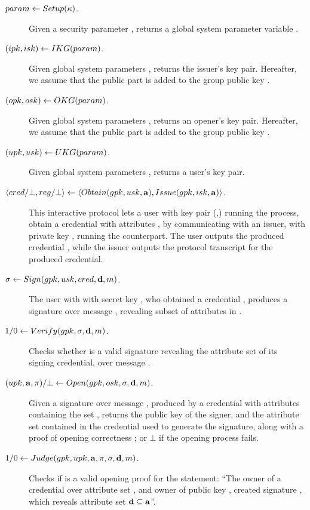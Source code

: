 \begin{description}
\item[$param \gets Setup(\kappa)$.] Given a security parameter \secpar,
  returns a global system parameter variable \parm.
\item[$(ipk,isk) \gets IKG(param)$.] Given global system parameters
  \parm, returns the issuer's key pair. Hereafter, we assume that the public
  part \ipk is added to the group public key \gpk.
\item[$(opk,osk) \gets OKG(param)$.] Given global system parameters
  \parm, returns an opener's key pair. Hereafter, we assume that the public part
  \opk is added to the group public key \gpk.
\item[$(upk,usk) \gets UKG(param)$.] Given global system parameters
  \parm, returns a user's key pair.
\item[$\langle cred/\bot,reg/\bot \rangle \gets
  \langle Obtain(gpk,usk,\mathbf{a}),Issue(gpk,isk,\mathbf{a}) \rangle$.]
  This interactive protocol lets a user with key pair (\upk,\usk) running the
  \Obtain process, obtain a credential \cred with attributes \attrs, by
  communicating with an issuer, with private key \isk, running the \Issue
  counterpart. The user outputs the produced credential \cred, while the issuer
  outputs the protocol transcript \utrans for the produced credential.
\item[$\sigma \gets Sign(gpk,usk,cred,\mathbf{d},m)$.] The user with
  with secret key \usk, who obtained a credential \cred, produces a signature
  \sig over message \msg, revealing subset of attributes \dattrs in \cred.
\item[$1/0 \gets Verify(gpk,\sigma,\mathbf{d},m)$.] Checks whether \sig is a
  valid signature revealing the attribute set \dattrs of its signing credential,
  over message \msg.
\item[$(upk,\mathbf{a},\pi)/\bot \gets
  Open(gpk,osk,\sigma,\mathbf{d},m)$.]
  Given a signature \sig over message \msg, produced by a credential with
  attributes containing the set \dattrs, returns the public key \upk of the
  signer, and the attribute set \attrs contained in the credential used to
  generate the signature, along with a proof of opening correctness \oproof; or
  $\bot$ if the opening process fails.
\item[$1/0 \gets Judge(gpk,upk,\mathbf{a},\pi,\sigma,\mathbf{d},
  m)$.] Checks if \oproof is a valid opening proof for the
  statement: ``The owner of a credential over attribute set \attrs, and owner
  of public key \upk, created signature \sig, which reveals attribute set
  $\mathbf{d} \subseteq \mathbf{a}$''.
\end{description}

